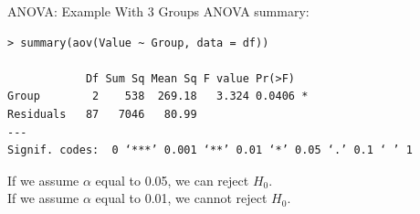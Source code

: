 \begin{frame}[fragile]{ANOVA: Example With 3 Groups}
    ANOVA summary:
    {\small
    \begin{verbatim}
> summary(aov(Value ~ Group, data = df))

            Df Sum Sq Mean Sq F value Pr(>F)  
Group        2    538  269.18   3.324 0.0406 *
Residuals   87   7046   80.99                 
---
Signif. codes:  0 ‘***’ 0.001 ‘**’ 0.01 ‘*’ 0.05 ‘.’ 0.1 ‘ ’ 1
    \end{verbatim}}
    If we assume $\alpha$ equal to 0.05, we can reject $H_0$.\\
    If we assume $\alpha$ equal to 0.01, we cannot reject $H_0$.
\end{frame}
